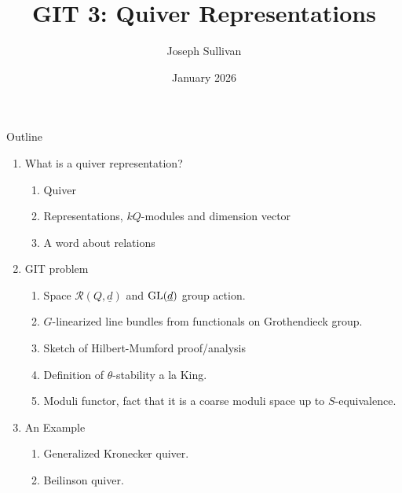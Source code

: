 \documentclass[12pt]{article}
\title{GIT 3: Quiver Representations}
\author{Joseph Sullivan}
\date{January 2026}
\begin{document}
\maketitle

Outline
\begin{enumerate}
    \item What is a quiver representation?
    \begin{enumerate}
        \item Quiver
        \item Representations, $kQ$-modules and dimension vector
        \item A word about relations
    \end{enumerate}
    \item GIT problem
    \begin{enumerate}
        \item Space $\mathcal{R}(Q,\underline{d})$ and $\mathrm{GL}(\underline{d})$ group action.
        \item $G$-linearized line bundles from functionals on Grothendieck group.
        \item Sketch of Hilbert-Mumford proof/analysis
        \item Definition of $\theta$-stability a la King.
        \item Moduli functor, fact that it is a coarse moduli space up to $S$-equivalence.
    \end{enumerate}
    \item An Example
    \begin{enumerate}
        \item Generalized Kronecker quiver.
        \item Beilinson quiver.
    \end{enumerate}
\end{enumerate}
\end{document}

